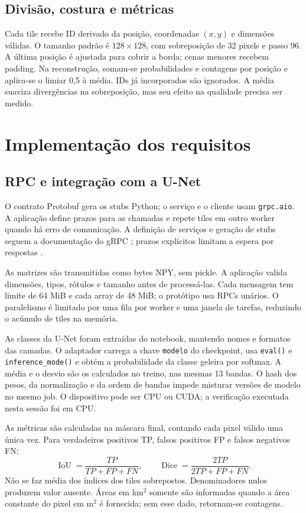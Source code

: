 \documentclass[12pt]{article}
\begin{document}
\subsection{Divisão, costura e métricas}
Cada tile recebe ID derivado da posição, coordenadas $(x,y)$ e dimensões válidas. O tamanho padrão é $128\times128$, com sobreposição de 32 pixels e passo 96. A última posição é ajustada para cobrir a borda; cenas menores recebem padding. Na reconstrução, somam-se probabilidades e contagens por posição e aplica-se o limiar 0,5 à média. IDs já incorporados são ignorados. A média suaviza divergências na sobreposição, mas seu efeito na qualidade precisa ser medido.

\newpage
\section{Implementação dos requisitos}
\subsection{RPC e integração com a U-Net}
O contrato Protobuf gera os stubs Python; o serviço e o cliente usam \texttt{grpc.aio}. A aplicação define prazos para as chamadas e repete tiles em outro worker quando há erro de comunicação. A definição de serviços e geração de stubs seguem a documentação do gRPC \cite{grpc}; prazos explícitos limitam a espera por respostas \cite{deadlines}.

As matrizes são transmitidas como bytes NPY, sem pickle. A aplicação valida dimensões, tipos, rótulos e tamanho antes de processá-las. Cada mensagem tem limite de 64 MiB e cada array de 48 MiB; o protótipo usa RPCs unários. O paralelismo é limitado por uma fila por worker e uma janela de tarefas, reduzindo o acúmulo de tiles na memória.

As classes da U-Net foram extraídas do notebook, mantendo nomes e formatos das camadas. O adaptador carrega a chave \texttt{modelo} do checkpoint, usa \texttt{eval()} e \texttt{inference\_mode()} e obtém a probabilidade da classe geleira por softmax. A média e o desvio são os calculados no treino, nas mesmas 13 bandas. O hash dos pesos, da normalização e da ordem de bandas impede misturar versões de modelo no mesmo job. O dispositivo pode ser CPU ou CUDA; a verificação executada nesta sessão foi em CPU.

As métricas são calculadas na máscara final, contando cada pixel válido uma única vez. Para verdadeiros positivos TP, falsos positivos FP e falsos negativos FN:
\[
\operatorname{IoU}=\frac{TP}{TP+FP+FN},\qquad
\operatorname{Dice}=\frac{2TP}{2TP+FP+FN}.
\]
Não se faz média dos índices dos tiles sobrepostos. Denominadores nulos produzem valor ausente. Áreas em km$^2$ somente são informadas quando a área constante do pixel em m$^2$ é fornecida; sem esse dado, retornam-se contagens.
\end{document}
